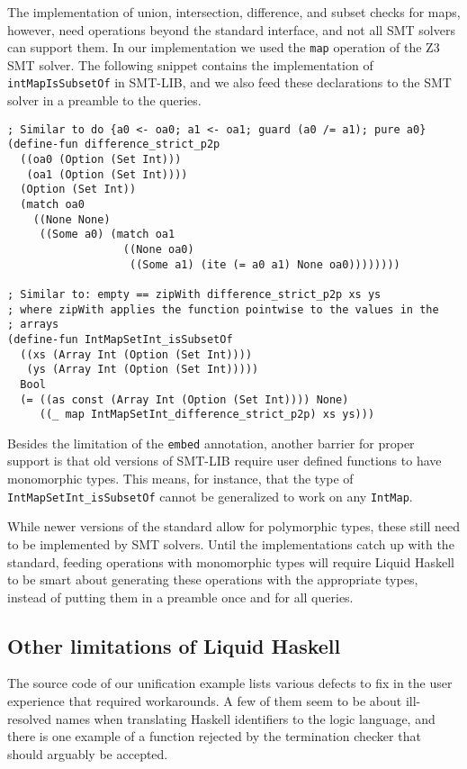 \documentclass[sigconf, anonymous, review]{acmart}
\newcommand{\tc}[1]{{\small\texttt{#1}}}
\begin{document}
The implementation of union, intersection,
difference, and subset checks for maps, however,
need operations beyond the standard interface, and not all SMT solvers can support
them. In our implementation we used the \tc{map} operation of the
Z3 SMT solver. The following snippet contains the implementation of
\tc{intMapIsSubsetOf} in SMT-LIB, and we also feed these declarations to the
SMT solver in a preamble to the queries.

\begin{verbatim}
; Similar to do {a0 <- oa0; a1 <- oa1; guard (a0 /= a1); pure a0}
(define-fun difference_strict_p2p
  ((oa0 (Option (Set Int)))
   (oa1 (Option (Set Int))))
  (Option (Set Int))
  (match oa0
    ((None None)
     ((Some a0) (match oa1
                  ((None oa0)
                   ((Some a1) (ite (= a0 a1) None oa0))))))))

; Similar to: empty == zipWith difference_strict_p2p xs ys
; where zipWith applies the function pointwise to the values in the
; arrays
(define-fun IntMapSetInt_isSubsetOf
  ((xs (Array Int (Option (Set Int))))
   (ys (Array Int (Option (Set Int)))))
  Bool
  (= ((as const (Array Int (Option (Set Int)))) None)
     ((_ map IntMapSetInt_difference_strict_p2p) xs ys)))
\end{verbatim}

Besides the limitation of the \tc{embed} annotation, another barrier for
proper support is that old versions of SMT-LIB require user defined
functions to have monomorphic types. This means, for instance, that
the type of \tc{IntMapSetInt\_isSubsetOf} cannot be generalized to work
on any \tc{IntMap}.

While newer versions of the standard allow
for polymorphic types, these still need to be implemented by SMT solvers.
Until the implementations catch up with the standard, feeding operations with
monomorphic types will require Liquid Haskell to be smart about generating
these operations with the appropriate types, instead of putting them in a
preamble once and for all queries.


\subsection{Other limitations of Liquid Haskell}
\label{limitations-of-liquid-haskell}

The source code of our unification example lists various defects to fix
in the user experience that required workarounds. A few of them seem to
be about ill-resolved names when translating Haskell identifiers to the
logic language, and there is one example of a function rejected by the
termination checker that should arguably be accepted.
\end{document}
